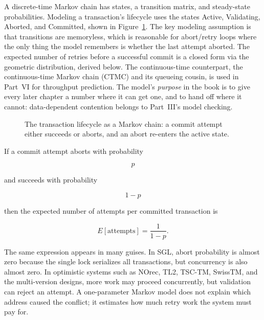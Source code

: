 A discrete-time Markov chain has states, a transition matrix, and steady-state probabilities. Modeling a transaction's lifecycle uses the states Active, Validating, Aborted, and Committed, shown in Figure~\ref{fig:tx-lifecycle}. The key modeling assumption is that transitions are memoryless, which is reasonable for abort/retry loops where the only thing the model remembers is whether the last attempt aborted. The expected number of retries before a successful commit is a closed form via the geometric distribution, derived below. The continuous-time counterpart, the continuous-time Markov chain (CTMC) and its queueing cousin, is used in Part~VI for throughput prediction. The model's \emph{purpose} in the book is to give every later chapter a number where it can get one, and to hand off where it cannot: data-dependent contention belongs to Part~III's model checking.

\begin{figure}[ht]
\centering
{}
\caption{The transaction lifecycle as a Markov chain: a commit attempt either succeeds or aborts, and an abort re-enters the active state.}
\label{fig:tx-lifecycle}
\end{figure}

If a commit attempt aborts with probability

$$
p
$$

and succeeds with probability

$$
1-p
$$

then the expected number of attempts per committed transaction is

$$
E[\mathrm{attempts}] = \frac{1}{1-p}.
$$

The same expression appears in many guises. In SGL, abort probability is almost zero because the single lock serializes all transactions, but concurrency is also almost zero. In optimistic systems such as NOrec, TL2, TSC-TM, SwissTM, and the multi-version designs, more work may proceed concurrently, but validation can reject an attempt. A one-parameter Markov model does not explain which address caused the conflict; it estimates how much retry work the system must pay for.

